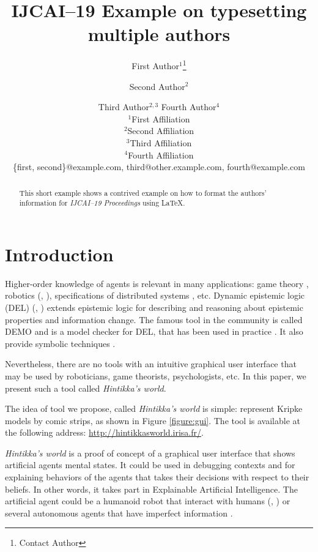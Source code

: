 \documentclass{article}
\title{IJCAI--19 Example on typesetting multiple authors}
\author{
First Author$^1$\footnote{Contact Author}\and
Second Author$^2$\and
Third Author$^{2,3}$\And
Fourth Author$^4$\\
\affiliations
$^1$First Affiliation\\
$^2$Second Affiliation\\
$^3$Third Affiliation\\
$^4$Fourth Affiliation\\
\emails
\{first, second\}@example.com,
third@other.example.com,
fourth@example.com
}
\begin{document}
\newcommand{\mettel}{\textsf{MetTeL2}\xspace}

\maketitle

\begin{abstract}
This short example shows a contrived example on how to format the authors' information for {\it IJCAI--19 Proceedings} using \LaTeX{}.
\end{abstract}



\section{Introduction}

Higher-order knowledge of agents is relevant in many applications: game theory \cite{DBLP:journals/ijgt/Aumann99}, robotics (\cite{DBLP:journals/arobots/Scassellati02}, \cite{DBLP:conf/hri/DevinA16}), specifications of distributed systems \cite{DBLP:journals/dc/HalpernF89}, etc. Dynamic epistemic logic (DEL) (\cite{baltag1998logic}, \cite{DitmarschvdHoekKooi})
extends epistemic logic %
for describing and reasoning about epistemic properties and information change.
%
%
The famous tool in the community is called DEMO \cite{van2007demo} and is a model checker for DEL, that has been used in practice \cite{DBLP:conf/paams/DitmarschEHSSS12}.
It also provide symbolic techniques \cite{DBLP:conf/lori/BenthemEGS15}.


Nevertheless, there are no tools with an intuitive graphical user interface that may be used by roboticians, game theorists, psychologists, etc. In this paper, we present such a tool called \emph{Hintikka's world}.%


The idea of tool we propose, called \emph{Hintikka's world} is simple: represent Kripke models by comic strips, as shown in Figure \ref{figure:gui}. The tool is available at the following address:
\url{http://hintikkasworld.irisa.fr/}. 

\emph{Hintikka's world} is a proof of concept of a graphical user interface that shows artificial agents mental states. It could be used in debugging contexts and for explaining behaviors of the agents that takes their decisions with respect to their beliefs. In other words, it takes part in Explainable Artificial Intelligence.
The artificial agent could be a humanoid robot that interact with humans (\cite{DBLP:journals/arobots/Scassellati02}, \cite{DBLP:conf/hri/DevinA16}) or several autonomous agents that have imperfect information \cite{AAAI2018kbps}.
\end{document}
